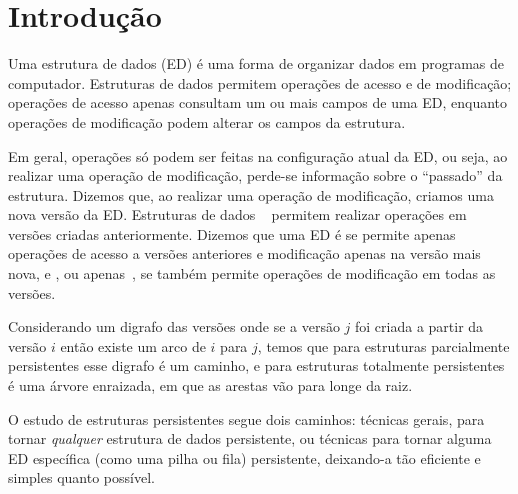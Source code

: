 \documentclass[main.tex]{subfiles}
\begin{document}
\setcounter{secnumdepth}{0}

\chapter*{Introdução}

Uma estrutura de dados (ED) é uma forma de organizar dados em programas de computador. Estruturas de dados permitem operações de acesso e de modificação; operações de acesso apenas consultam um ou mais campos de uma ED, enquanto operações de modificação podem alterar os campos da estrutura.

Em geral, operações só podem ser feitas na configuração atual da ED, ou seja, ao realizar uma operação de modificação, perde-se informação sobre o ``passado'' da estrutura. Dizemos que, ao realizar uma operação de modificação, criamos uma nova versão da ED. Estruturas de dados ~\cite{DriscollSST1989} permitem realizar operações em versões criadas anteriormente. Dizemos que uma ED é  se permite apenas operações de acesso a versões anteriores e modificação apenas na versão mais nova, e , ou apenas~, se também permite operações de modificação em todas as versões.

Considerando um digrafo das versões onde se a versão $j$ foi criada a partir da versão $i$ então existe um arco de $i$ para $j$, temos que para estruturas parcialmente persistentes esse digrafo é um caminho, e para estruturas totalmente persistentes é uma árvore enraizada, em que as arestas vão para longe da raiz.

O estudo de estruturas persistentes segue dois caminhos: técnicas gerais, para tornar \emph{qualquer} estrutura de dados persistente, ou técnicas para tornar alguma ED específica (como uma pilha ou fila) persistente, deixando-a tão eficiente e simples quanto possível.

\setcounter{secnumdepth}{1}
\end{document}
